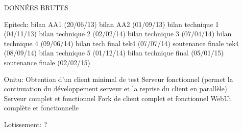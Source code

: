DONNÉES BRUTES


Epitech:
bilan AA1 (20/06/13)
bilan AA2 (01/09/13)
bilan technique 1 (04/11/13)
bilan technique 2 (02/02/14)
bilan technique 3 (07/04/14)
bilan technique 4 (09/06/14)
bilan tech final tek4 (07/07/14)
soutenance finale tek4 (08/09/14)
bilan technique 5 (01/12/14)
bilan technique final (05/01/15)
soutenance finale (02/02/15)


Onitu:
Obtention d'un client minimal de test
Serveur fonctionnel (permet la continuation du développement serveur et la reprise du client en parallèle)
Serveur complet et fonctionnel
Fork de client complet et fonctionnel
WebUi complète et fonctionnelle


Lotissement:
?